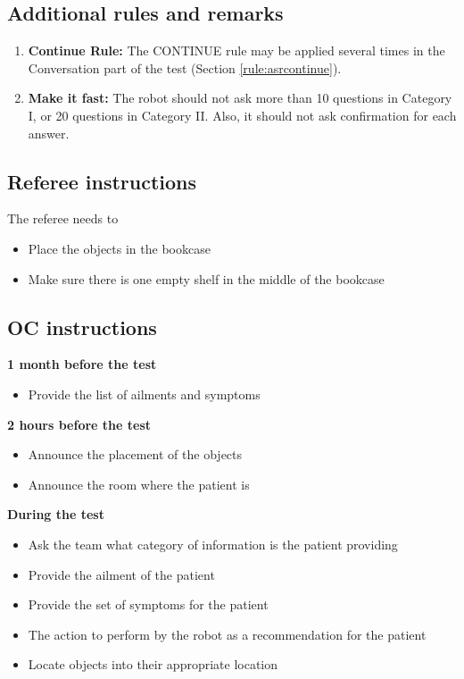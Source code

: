 \subsection{Additional rules and remarks}
\begin{enumerate}
\item \textbf{Continue Rule:} The CONTINUE rule may be applied several times in the Conversation part of the test (Section \ref{rule:asrcontinue}).
\item \textbf{Make it fast:} The robot should not ask more than 10 questions in Category I, or 20 questions in Category II. Also, it should not ask confirmation for each answer.
\end{enumerate}

\subsection{Referee instructions}

The referee needs to
\begin{itemize}
\item Place the objects in the bookcase
\item Make sure there is one empty shelf in the middle of the bookcase
\end{itemize}

\subsection{OC instructions}

\textbf{1 month before the test}
\begin{itemize}
\item Provide the list of ailments and symptoms
\end{itemize}
\textbf{2 hours before the test}
\begin{itemize}
\item Announce the placement of the objects
\item Announce the room where the patient is
\end{itemize}
\textbf{During the test}
\begin{itemize}
\item Ask the team what category of information is the patient providing
\item Provide the ailment of the patient
\item Provide the set of symptoms for the patient
\item The action to perform by the robot as a recommendation for the patient
\item Locate objects into their appropriate location
\end{itemize}

